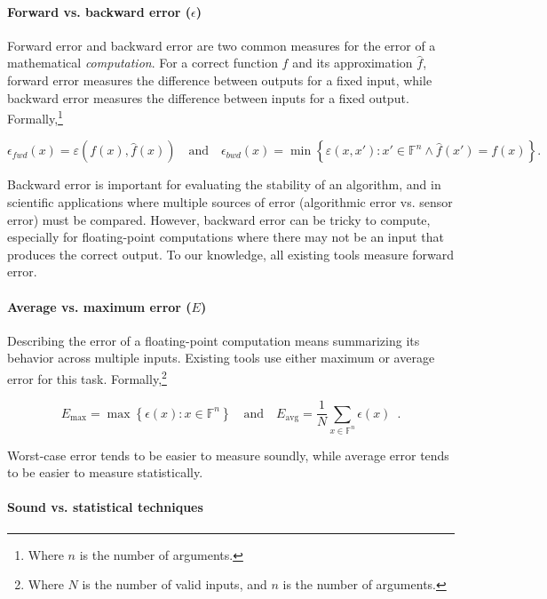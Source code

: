 \documentclass[main.tex]{subfiles}
\begin{document}
\paragraph{Forward vs. backward error ($\epsilon$)}

Forward error and backward error are two common measures
  for the error of a mathematical \emph{computation}.
For a correct function $f$ and its approximation $\hat f$,
  forward error measures the difference between outputs for a fixed input,
  while backward error measures the difference between inputs
  for a fixed output.
Formally,\footnote{Where $n$ is the number of arguments.}

\begin{equation*}
  \epsilon_{fwd}(x) = \varepsilon(f(x), \hat{f}(x))
  \quad \text{and} \quad
  \epsilon_{bwd}(x) =
  \min \left\{ \varepsilon(x, x') : x' \in \mathbb{F}^n \land {\hat f}(x') = f(x) \right\}.
\end{equation*}

Backward error is important for evaluating the stability of an algorithm,
  and in scientific applications where multiple sources of error
  (algorithmic error vs. sensor error) must be compared.
However, backward error can be tricky to compute,
  especially for floating-point computations
  where there may not be an input that produces the correct output.
To our knowledge, all existing tools measure forward error.

\paragraph{Average vs. maximum error ($E$)}

Describing the error of a floating-point computation
  means summarizing its behavior across multiple inputs.
Existing tools use either maximum or average error for this task.
Formally,\footnote{Where $N$ is the number of valid inputs, and $n$ is the number of arguments.}

\begin{equation*}
  E_{\text{max}} = \max \left\{\epsilon(x) : x \in \mathbb{F}^n\right\}
  \quad \text{and} \quad
  E_{\text{avg}} = \frac{1}{N} \sum_{x\in \mathbb{F}^n} \epsilon(x) \enspace .
\end{equation*}

Worst-case error tends to be easier to measure soundly,
  while average error tends to be easier to measure statistically.

\paragraph{Sound vs. statistical techniques}
\end{document}
